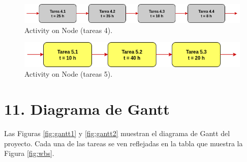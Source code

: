 \documentclass[
11pt, %
]{charter}
\begin{document}
\begin{figure}[H]
\centering
\includegraphics[scale=0.6]{./Figuras/tareas_4.png}
\caption{Activity on Node (tareas 4).}
\label{fig:tareas_4}
\end{figure}

\begin{figure}[H]
\centering
\includegraphics[scale=0.6]{./Figuras/tareas_5.png}
\caption{Activity on Node (tareas 5).}
\label{fig:tareas_5}
\end{figure}

\section{11. Diagrama de Gantt}
\label{sec:gantt}

Las Figuras \ref{fig:gantt1} y \ref{fig:gantt2} muestran el diagrama de Gantt del proyecto. Cada una de las tareas se ven reflejadas en la tabla que muestra la Figura \ref{fig:wbs}.
\end{document}
